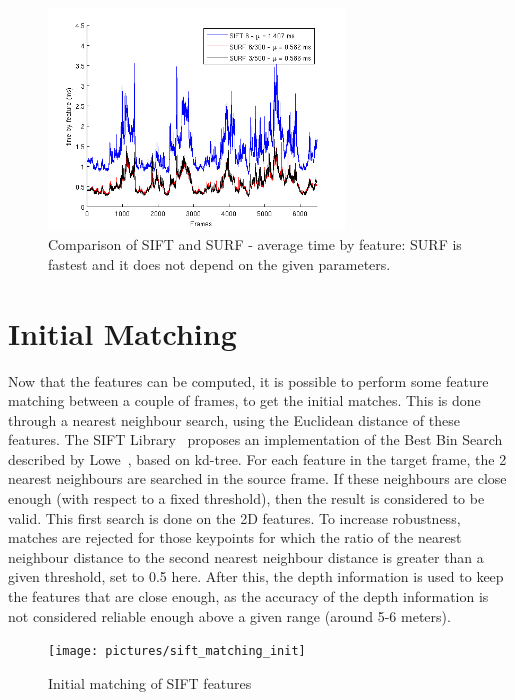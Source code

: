 \begin{figure}[H]
\begin{center}
\includegraphics[width=0.7\textwidth]{figures/stats_features_tbf}
\caption{Comparison of SIFT and SURF - average time by feature: SURF is fastest and it does not depend on the given parameters.}
\end{center}
\end{figure}

\section{Initial Matching}

Now that the features can be computed, it is possible to perform some feature matching between a couple of frames, to get the initial matches. This is done through a nearest neighbour search, using the Euclidean distance of these features.  
The SIFT Library~\cite{hess_sift} proposes an implementation of the Best Bin Search described by Lowe~\cite{lowe_2004_sift}, based on kd-tree. For each feature in the target frame, the 2 nearest neighbours are searched in the source frame. If these neighbours are close enough (with respect to a fixed threshold), then the result is considered to be valid. This first search is done on the 2D features. To increase robustness, matches are rejected for those keypoints for which the ratio of the nearest neighbour distance to the second nearest neighbour distance is greater than a given threshold, set to 0.5 here. After this, the depth information is used to keep the features that are close enough, as the accuracy of the depth information is not considered reliable enough above a given range (around 5-6 meters).

\begin{figure}[H]
\centering
\texttt{[image: pictures/sift\_matching\_init]}
\caption{Initial matching of SIFT features}
\end{figure}

